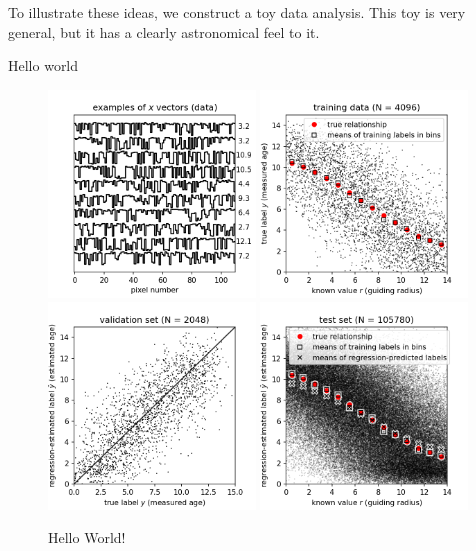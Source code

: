 \documentclass[11pt]{article}
\begin{document}
To illustrate these ideas, we construct a toy data analysis.
This toy is very general, but it has a clearly astronomical feel to it.

Hello world
\begin{figure}[t!]
\includegraphics[width=0.49\textwidth]{notebooks/data_examples.png}
\includegraphics[width=0.49\textwidth]{notebooks/training_data.png} \\
\includegraphics[width=0.49\textwidth]{notebooks/validation.png}
\includegraphics[width=0.49\textwidth]{notebooks/test_data_results.png}
\caption{\sffamily%
Hello World!\label{fig:regression}}
\end{figure}
\end{document}
